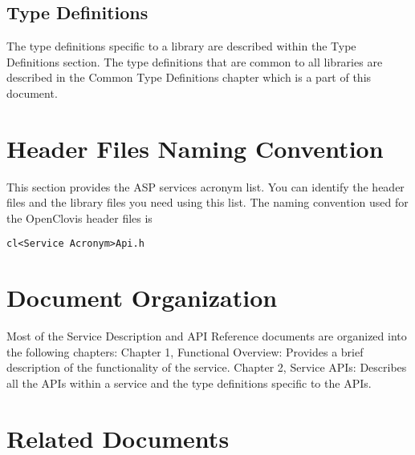 \subsection{Type Definitions}
The type definitions specific to a library are described within the Type Definitions section. The type definitions that are
common to all libraries are described in the Common Type Definitions chapter which is a part of this document.


\section{Header Files Naming Convention}
\begin{flushleft}
This section provides the ASP services acronym list. You can identify the header files and the library files you need 
using this list. The naming convention used for the OpenClovis header files is
\footnotesize 
\begin{verbatim} 
cl<Service Acronym>Api.h
\end{verbatim}
\normalsize



\end{flushleft}




\section{Document Organization}
\begin{flushleft}
Most of the Service Description and API Reference documents are organized into the following chapters:
\newline  
\newline
Chapter 1, Functional Overview: Provides a brief description of the functionality of the service.
\newline  
\newline
Chapter 2, Service APIs: Describes all the APIs within a service and the type definitions specific to the APIs.
\end{flushleft}

\section{Related Documents}

